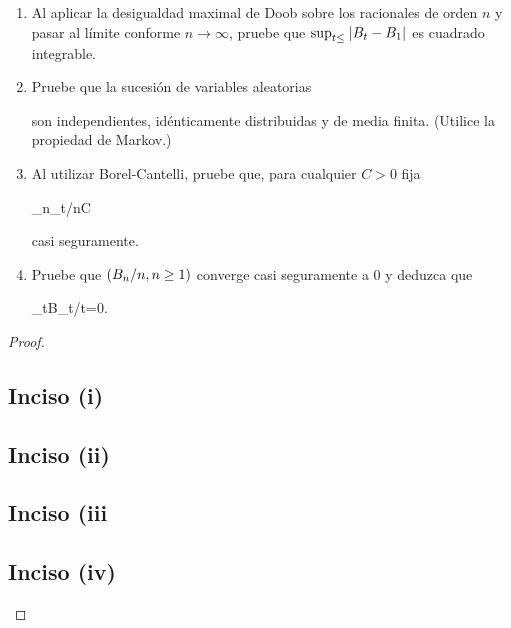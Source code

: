 \begin{problema}
	\mbox{}
	\begin{enumerate}
	\item 
		Al aplicar la desigualdad maximal de Doob sobre los racionales de orden $n$ y pasar al l\'imite 
        conforme $n\to\infty$, pruebe que $\sup_{t\leq }\hspace{.25mm}\left|B_t-B_1\right|\hspace{.25mm}$ es cuadrado integrable.\pn
	
	\item 
		Pruebe que la sucesi\'on de variables aleatorias
		\begin{esn}
		\end{esn}
		son independientes, id\'enticamente distribuidas y de media finita. (Utilice la propiedad de Markov.)\pn
	
	\item 
		Al utilizar Borel-Cantelli, pruebe que, para cualquier $C>0$ fija
		\begin{esn}
			\limsup_{n\to\infty}\sup_{t\in [0,1]}/n\leq C
		\end{esn} 
        casi seguramente.\pn
	
	\item 
		Pruebe que $\left( B_n/n,n\geq 1\right) $ converge casi seguramente a $0$ y deduzca que
		\begin{esn}
			\lim_{t\to\infty }B_t/t=0.
		\end{esn}\pn
	\end{enumerate}
\end{problema}

\begin{proof}
    \subsection{Inciso (i)} \label{problema6_5:inciso1}
    
    \newpage

    \subsection{Inciso (ii)} \label{problema6_5:inciso2}
     
    \newpage

    \subsection{Inciso (iii} \label{problema6_5:inciso3}
     
    \newpage

    \subsection{Inciso (iv)} \label{problema6_5:inciso4}
     
\end{proof}
